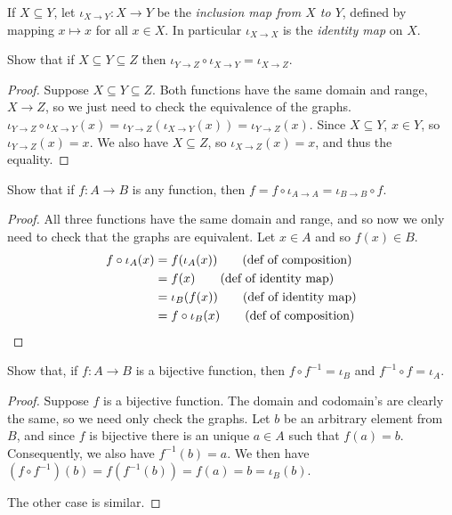 \documentclass[12pt]{article}
\newenvironment{definition}[2][Definition]{\begin{trivlist}
\item[\hskip \labelsep {\bfseries #1}\hskip \labelsep {\bfseries #2}]}{\end{trivlist}}
\newenvironment{exercise}[2][Exercise]{\begin{trivlist}
\item[\hskip \labelsep {\bfseries #1}\hskip \labelsep {\bfseries #2}]}{\end{trivlist}}
\begin{document}
\begin{definition}{}
	If $ X \subseteq Y $, let $ \iota_{X \to Y} : X \to Y $ be the \textit{inclusion map from $ X $ to $ Y $}, defined by mapping $ x \mapsto x $ for all $ x \in X $.
	In particular $ \iota_{X \to X} $ is the \textit{identity map} on $ X $.
\end{definition}

\begin{exercise}{3.3.8a}
	Show that if $ X \subseteq Y \subseteq Z $ then $ \iota_{Y \to Z} \circ \iota_{X \to Y} = \iota_{X \to Z} $.
\end{exercise}
\begin{proof}
	Suppose $ X \subseteq Y \subseteq Z $.
	Both functions have the same domain and range, $ X \to Z $, so we just need to check the equivalence of the graphs.
	$ \iota_{Y \to Z} \circ \iota_{X \to Y}(x) = \iota_{Y \to Z}(\iota_{X \to Y}(x)) = \iota_{Y \to Z}(x) $.
	Since $ X \subseteq Y $, $ x \in Y $, so $ \iota_{Y \to Z}(x) = x $.
	We also have $ X \subseteq Z $, so $ \iota_{X \to Z}(x) = x $, and thus the equality.
\end{proof}

\begin{exercise}{3.3.8b}
	Show that if $ f : A \to B $ is any function, then $ f = f \circ \iota_{A \to A} = \iota_{B \to B} \circ f $.
\end{exercise}
\begin{proof}
	All three functions have the same domain and range, and so now we only need to check that the graphs are equivalent.
	Let $ x \in A $ and so $ f(x) \in B $.
	\begin{align*}
		f \circ \iota_{A}(x)
		&= f(\iota_{A}(x)) \tag{\text{def of composition}}
		\\ &= f(x) \tag{\text{def of identity map}}
		\\ &= \iota_{B}(f(x)) \tag{\text{def of identity map}}
		\\ &= f \circ \iota_{B}(x) \tag{\text{def of composition}}
	\end{align*}
\end{proof}

\begin{exercise}{3.3.8c}
	Show that, if $ f : A \to B $ is a bijective function, then $ f \circ f^{-1} = \iota_{B} $ and $ f^{-1} \circ f = \iota_{A} $.
\end{exercise}
\begin{proof}
	Suppose $ f $ is a bijective function.
	The domain and codomain's are clearly the same, so we need only check the graphs.
	Let $ b $ be an arbitrary element from $ B $, and since $ f $ is bijective there is an unique $ a \in A $ such that $ f(a) = b $.
	Consequently, we also have $ f^{-1}(b) = a $.
	We then have $ (f \circ f^{-1})(b) = f(f^{-1}(b)) = f(a) = b = \iota_{B}(b) $.
	
	The other case is similar.
\end{proof}
\end{document}
